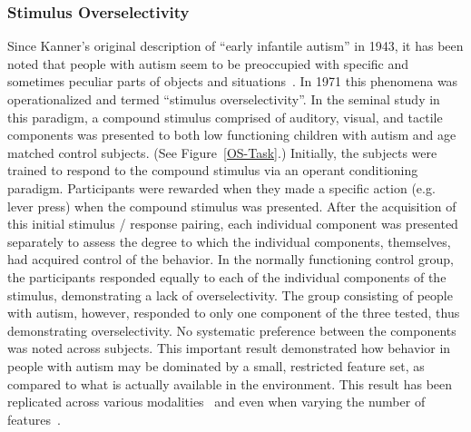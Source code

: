 \documentclass[man]{apa}
\begin{document}
\subsubsection{Stimulus Overselectivity}
Since Kanner's original description of ``early infantile autism'' in 1943, it has been noted that people with autism seem to be preoccupied with specific and sometimes peculiar parts of objects and situations~\cite{KannerL:1943:Autism}. In 1971 this phenomena was operationalized and termed ``stimulus overselectivity''.  In the seminal study in this paradigm, a compound stimulus comprised of auditory, visual, and tactile components was presented to both low functioning children with autism and age matched control subjects. (See Figure~\ref{OS-Task}.)  Initially, the subjects were trained to respond to the compound stimulus via an operant conditioning paradigm.  Participants were rewarded when they made a specific action (e.g. lever press) when the compound stimulus was presented.  After the acquisition of this initial stimulus / response pairing, each individual component was presented separately to assess the degree to which the individual components, themselves, had acquired control of the behavior.  In the normally functioning control group, the participants responded equally to each of the individual components of the stimulus, demonstrating a lack of overselectivity.  The group consisting of people with autism, however, responded to only one component of the three tested, thus demonstrating overselectivity.  No systematic preference between the components was noted across subjects.   This important result demonstrated how behavior in people with autism may be dominated by a small, restricted feature set, as compared to what is actually available in the environment.  This result has been replicated across various modalities~\cite{RefWorks:128,RefWorks:129} and even when varying the number of features~\cite{RefWorks:131}.  
\end{document}
